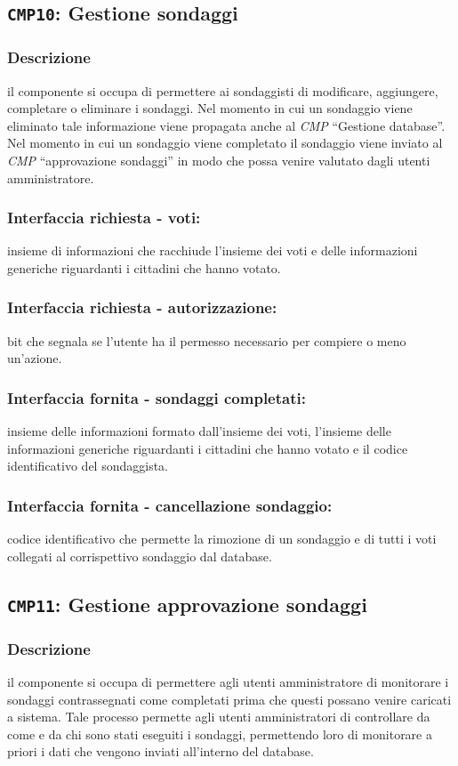     \subsection{\texttt{CMP10}: Gestione sondaggi}
        \subsubsection{Descrizione}
            il componente si occupa di permettere ai sondaggisti di modificare, aggiungere, completare o eliminare i sondaggi. Nel momento in cui un sondaggio viene eliminato tale informazione viene propagata anche al \textit{CMP} ``Gestione database''. Nel momento in cui un sondaggio viene completato il sondaggio viene inviato al \textit{CMP} ``approvazione sondaggi'' in modo che possa venire valutato dagli utenti amministratore.
        \subsubsection{Interfaccia richiesta - voti:}
            insieme di informazioni che racchiude l'insieme dei voti e delle informazioni generiche riguardanti i cittadini che hanno votato.
        \subsubsection{Interfaccia richiesta - autorizzazione:}
            bit che segnala se l'utente ha il permesso necessario per compiere o meno un'azione.
        \subsubsection{Interfaccia fornita - sondaggi completati:}
            insieme delle informazioni formato dall'insieme dei voti, l'insieme delle informazioni generiche riguardanti i cittadini che hanno votato e il codice identificativo del sondaggista.
        \subsubsection{Interfaccia fornita - cancellazione sondaggio:}
            codice identificativo che permette la rimozione di un sondaggio e di tutti i voti collegati al corrispettivo sondaggio dal database.

    \subsection{\texttt{CMP11}: Gestione approvazione sondaggi}
        \subsubsection{Descrizione}
            il componente si occupa di permettere agli utenti amministratore di monitorare i sondaggi contrassegnati come completati prima che questi possano venire caricati a sistema. Tale processo permette agli utenti amministratori di controllare da come e da chi sono stati eseguiti i sondaggi, permettendo loro di monitorare a priori i dati che vengono inviati all'interno del database. 
